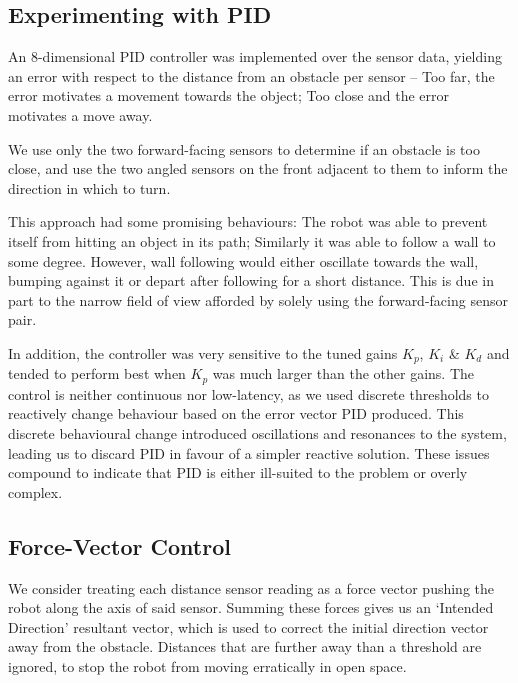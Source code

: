 \documentclass[11pt, a4paper]{article}
\begin{document}
\subsection{Experimenting with PID}


An 8-dimensional PID controller was implemented over the sensor data, yielding an error 
with respect to the distance from an obstacle per sensor -- Too far, the error motivates 
a movement towards the object; Too close and the error motivates a move away.

We use only the two forward-facing sensors to determine if an obstacle is too close, 
and use the two angled sensors on the front adjacent to them to inform the direction in 
which to turn.

This approach had some promising behaviours: The robot was able to prevent itself 
from hitting an object in its path; Similarly it was able to follow a wall to some degree. 
However, wall following would either oscillate towards the wall, bumping against it or 
depart after following for a short distance. This is due in part to the narrow field 
of view afforded by solely using the forward-facing sensor pair.

In addition, the controller was very sensitive to the tuned gains ${K_p}$, ${K_i}$ \&
${K_d}$ and tended to perform best when ${K_p}$ was much larger than the other gains.
The control is neither continuous nor low-latency, as we used discrete thresholds to 
reactively change behaviour based on the error vector PID produced. This discrete 
behavioural change introduced oscillations and resonances to the system, leading us 
to discard PID in favour of a simpler reactive solution. These issues compound to 
indicate that PID is either ill-suited to the problem or overly complex.



\subsection{Force-Vector Control}

We consider treating each distance sensor reading as a force vector pushing 
the robot along the axis of said sensor. Summing these forces gives us an 
`Intended Direction' resultant vector, which is used to correct the initial 
direction vector away from the obstacle. Distances that are further away than
 a threshold are ignored, to stop the robot from moving erratically in open space.
\end{document}
